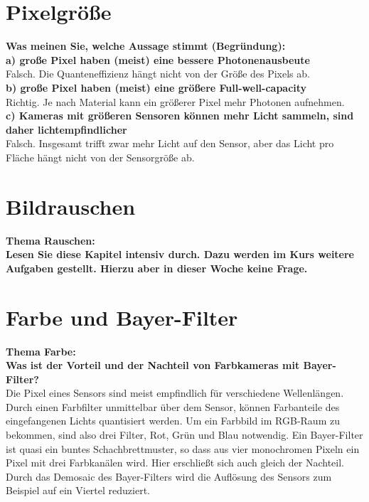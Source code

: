 \documentclass[a4paper]{article}
\begin{document}
	\section{Pixelgröße}
	\textbf{Was meinen Sie, welche Aussage stimmt (Begründung):}\\
	\textbf{a) große Pixel haben (meist) eine bessere Photonenausbeute}\\
	Falsch. Die Quanteneffizienz hängt nicht von der Größe des Pixels ab.\\
	\textbf{b) große Pixel haben (meist) eine größere Full-well-capacity}\\
	Richtig. Je nach Material kann ein größerer Pixel mehr Photonen aufnehmen.\\
	\textbf{c) Kameras mit größeren Sensoren können mehr Licht sammeln, sind daher
	lichtempfindlicher}\\
	Falsch. Insgesamt trifft zwar mehr Licht auf den Sensor, aber das Licht pro Fläche hängt nicht von der Sensorgröße ab. 
	
	\section{Bildrauschen}
	\textbf{Thema Rauschen:}\\
	\textbf{Lesen Sie diese Kapitel intensiv durch. Dazu werden im Kurs weitere Aufgaben gestellt.
	Hierzu aber in dieser Woche keine Frage.}
	
	\section{Farbe und Bayer-Filter}
	\textbf{Thema Farbe:}\\
	\textbf{Was ist der Vorteil und der Nachteil von Farbkameras mit Bayer-Filter?}\\
	Die Pixel eines Sensors sind meist empfindlich für verschiedene Wellenlängen. Durch einen Farbfilter unmittelbar über dem Sensor, können Farbanteile des eingefangenen Lichts quantisiert werden. Um ein Farbbild im RGB-Raum zu bekommen, sind also drei Filter, Rot, Grün und Blau notwendig. Ein Bayer-Filter ist quasi ein buntes Schachbrettmuster, so dass aus vier monochromen Pixeln ein Pixel mit drei Farbkanälen wird. Hier erschließt sich auch gleich der Nachteil. Durch das Demosaic des Bayer-Filters wird die Auflösung des Sensors zum Beispiel auf ein Viertel reduziert.
    
    \newpage
	
\end{document}
